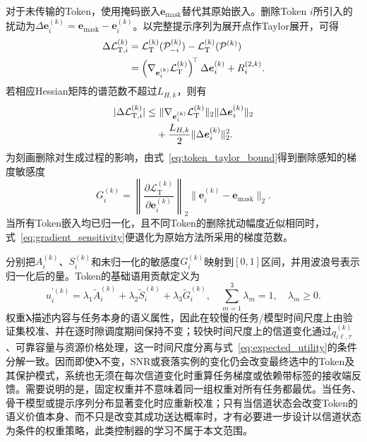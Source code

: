 \documentclass[journal]{IEEEtran}
\begin{document}
对于未传输的Token，使用掩码嵌入$\bm e_{\mathrm{mask}}$替代其原始嵌入。删除Token $i$所引入的扰动为$\Delta\bm e_i^{(k)}=\bm e_{\mathrm{mask}}-\bm e_i^{(k)}$。以完整提示序列为展开点作Taylor展开，可得
\begin{align}
\Delta\mathcal L_{\mathrm T,i}^{(k)}
&=\mathcal L_{\mathrm T}^{(k)}(\mathcal P_{-i}^{(k)})
-\mathcal L_{\mathrm T}^{(k)}(\mathcal P^{(k)})
\notag\\
&=\left(\nabla_{\bm e_i^{(k)}}\mathcal L_{\mathrm T}^{(k)}\right)^{\!\top}
\Delta\bm e_i^{(k)}+R_i^{(2,k)}.
\label{eq:token_taylor}
\end{align}
若相应Hessian矩阵的谱范数不超过$L_{H,k}$，则有
\begin{align}
|\Delta\mathcal L_{\mathrm T,i}^{(k)}|
\leq&~
\|\nabla_{\bm e_i^{(k)}}\mathcal L_{\mathrm T}^{(k)}\|_2
\|\Delta\bm e_i^{(k)}\|_2
\notag\\[-0.1em]
&+\frac{L_{H,k}}{2}\|\Delta\bm e_i^{(k)}\|_2^2.
\label{eq:token_taylor_bound}
\end{align}
为刻画删除对生成过程的影响，由式~\eqref{eq:token_taylor_bound}得到删除感知的梯度敏感度
\begin{equation}
G_i^{(k)}
=\left\|\frac{\partial\mathcal L_{\mathrm T}^{(k)}}
{\partial\bm e_i^{(k)}}\right\|_2
\|\bm e_i^{(k)}-\bm e_{\mathrm{mask}}\|_2.
\label{eq:gradient_sensitivity}
\end{equation}
当所有Token嵌入均已归一化，且不同Token的删除扰动幅度近似相同时，式~\eqref{eq:gradient_sensitivity}便退化为原始方法所采用的梯度范数。

分别把$A_i^{(k)}$、$S_i^{(k)}$和未归一化的敏感度$G_i^{(k)}$映射到$[0,1]$区间，并用波浪号表示归一化后的量。Token的基础语用贡献定义为
\begin{equation}
u_i^{\prime(k)}
=\lambda_1\widetilde A_i^{(k)}
+\lambda_2\widetilde S_i^{(k)}
+\lambda_3\widetilde G_i^{(k)},
\quad
\sum_{m=1}^{3}\lambda_m=1,
\quad \lambda_m\geq0.
\label{eq:base_utility}
\end{equation}
权重$\bm\lambda$描述内容与任务本身的语义属性，因此在较慢的任务/模型时间尺度上由验证集校准、并在逐时隙调度期间保持不变；较快时间尺度上的信道变化通过$q_{i\ell,\tau}^{(k)}$、可靠容量与资源价格处理，这一时间尺度分离与式~\eqref{eq:expected_utility}的条件分解一致。因而即使$\bm\lambda$不变，SNR或衰落实例的变化仍会改变最终选中的Token及其保护模式，系统也无须在每次信道变化时重算任务梯度或依赖带标签的接收端反馈。需要说明的是，固定权重并不意味着同一组权重对所有任务都最优。当任务、骨干模型或提示序列分布显著变化时应重新校准；只有当信道状态会改变Token的语义价值本身、而不只是改变其成功送达概率时，才有必要进一步设计以信道状态为条件的权重策略，此类控制器的学习不属于本文范围。
\end{document}
